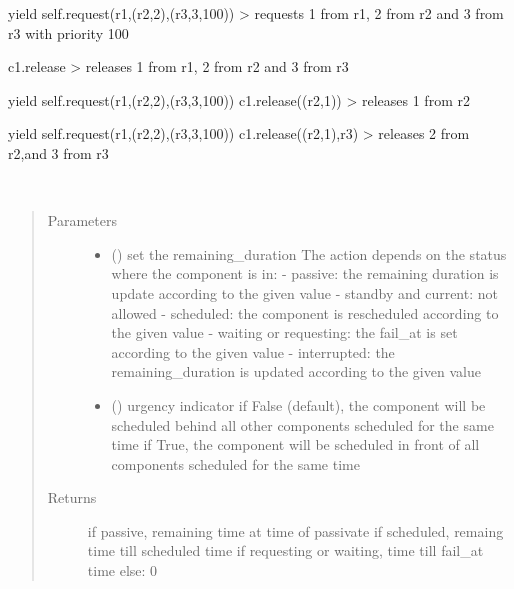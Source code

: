 \documentclass[letterpaper,10pt,english]{sphinxmanual}
\begin{document}
\begin{fulllineitems}
\begin{fulllineitems}
yield self.request(r1,(r2,2),(r3,3,100)) 
\textendash{}\textgreater{} requests 1 from r1, 2 from r2 and 3 from r3 with priority 100 

c1.release 
\textendash{}\textgreater{} releases 1 from r1, 2 from r2 and 3 from r3 

yield self.request(r1,(r2,2),(r3,3,100)) 
c1.release((r2,1)) 
\textendash{}\textgreater{} releases 1 from r2 

yield self.request(r1,(r2,2),(r3,3,100)) 
c1.release((r2,1),r3) 
\textendash{}\textgreater{} releases 2 from r2,and 3 from r3

\end{fulllineitems}


\begin{fulllineitems}
\label{\detokenize{Reference:salabim.Component.remaining_duration}}~\begin{quote}\begin{description}
\item[{Parameters}] \leavevmode\begin{itemize}
\item {} 
 () \textendash{} set the remaining\_duration 
The action depends on the status where the component is in: 
- passive: the remaining duration is update according to the given value 
- standby and current: not allowed 
- scheduled: the component is rescheduled according to the given value 
- waiting or requesting: the fail\_at is set according to the given value 
- interrupted: the remaining\_duration is updated according to the given value 

\item {} 
 () \textendash{} urgency indicator 
if False (default), the component will be scheduled
behind all other components scheduled
for the same time 
if True, the component will be scheduled
in front of all components scheduled
for the same time

\end{itemize}

\item[{Returns}] \leavevmode
{} \textendash{} if passive, remaining time at time of passivate 
if scheduled, remaing time till scheduled time 
if requesting or waiting, time till fail\_at time 
else: 0


\end{description}
\end{quote}
\end{fulllineitems}
\end{fulllineitems}
\end{document}
